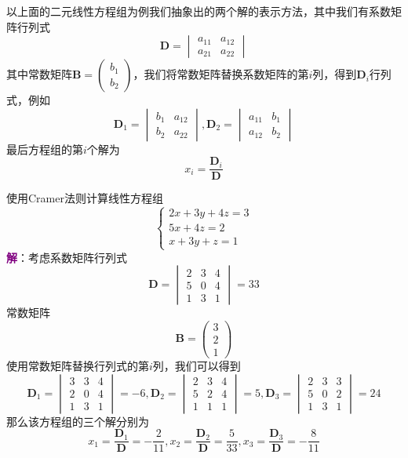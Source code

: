 以上面的二元线性方程组为例我们抽象出的两个解的表示方法，其中我们有系数矩阵行列式$$\mathbf{D}=\begin{vmatrix}
	a_{11} & a_{12}\\
	a_{21} & a_{22}
\end{vmatrix}$$其中常数矩阵$\mathbf{B}=\begin{pmatrix}
	b_1\\
	b_2
\end{pmatrix}$，我们将常数矩阵替换系数矩阵的第$i$列，得到$\mathbf{D}_i$行列式，例如$$\mathbf{D}_1=\begin{vmatrix}
	b_1 &a_{12}\\
	b_2 &a_{22}
   \end{vmatrix},\mathbf{D}_2=\begin{vmatrix}
	a_{11} & b_1 \\
	a_{12} & b_2
\end{vmatrix}$$最后方程组的第$i$个解为$$x_i=\frac{\mathbf{D}_i}{\mathbf{D}}$$

\begin{example}
	使用Cramer法则计算线性方程组$$\left\{\begin{matrix} 
		2x+3y+4z =3 \\  
		5x+4z=2\\
		x+3y+z=1
	  \end{matrix}\right. $$
	  \tcblower
	  \textcolor{purple}{\textbf{解}}：考虑系数矩阵行列式$$\mathbf{D}=\begin{vmatrix}
		2 & 3 & 4\\
		5 & 0 & 4\\
		1 & 3 & 1
	   \end{vmatrix}=33$$常数矩阵$$\mathbf{B}=\begin{pmatrix}
		3 \\
		2 \\
		1
		\end{pmatrix}$$使用常数矩阵替换行列式的第$i$列，我们可以得到$$\mathbf{D}_1=\begin{vmatrix}
			3 & 3 & 4\\
			2 & 0 & 4\\
			1 & 3 & 1
		   \end{vmatrix}=-6,\mathbf{D}_2=\begin{vmatrix}
			2 & 3 & 4\\
			5 & 2 & 4\\
			1 & 1 & 1
		   \end{vmatrix}=5,\mathbf{D}_3=\begin{vmatrix}
			2 & 3 & 3\\
			5 & 0 & 2\\
			1 & 3 & 1
		   \end{vmatrix}=24$$那么该方程组的三个解分别为$$x_1=\frac{\mathbf{D}_1}{\mathbf{D}}=-\frac{2}{11},x_2=\frac{\mathbf{D}_2}{\mathbf{D}}=\frac{5}{33},x_3=\frac{\mathbf{D}_3}{\mathbf{D}}=-\frac{8}{11}$$
\end{example}

